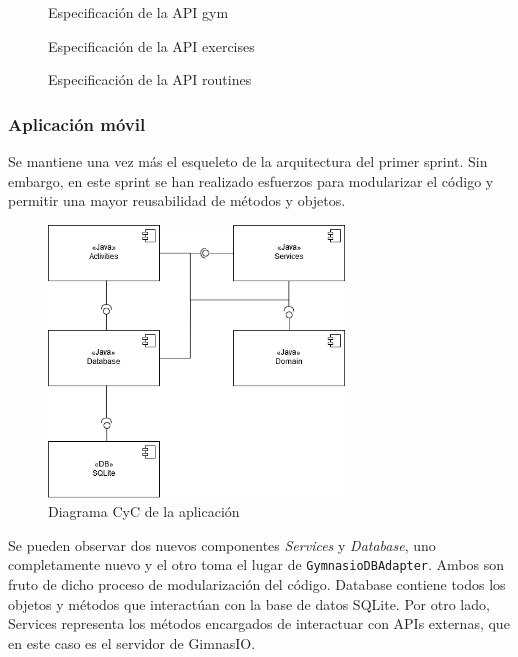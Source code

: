 \documentclass[11pt,a4paper]{report}
\begin{document}
\begin{figure}[H]
	\centering
	
	\caption{Especificación de la API gym}
	\label{cod:apiEx}
\end{figure}
\begin{figure}[H]
	\centering
	
	\caption{Especificación de la API exercises}
	\label{cod:apiRou}
\end{figure}
\newpage
\begin{figure}[H]
	\centering
	
	\label{cod:apiGym}
\end{figure}
\begin{figure}[H]
	\centering
	
	\caption{Especificación de la API routines}
	\label{cod:apiGym}
\end{figure}
\subsubsection{Aplicación móvil}
Se mantiene una vez más el esqueleto de la arquitectura del primer sprint. Sin embargo, en este sprint se han realizado esfuerzos para modularizar el código y permitir una mayor reusabilidad de métodos y objetos. 

\begin{figure}[H]
	\centering
	\includegraphics[width=0.7\textwidth]{graficos/CyCApp.png}
	\caption{Diagrama CyC de la aplicación }
	\label{fig: CyCApp2}
\end{figure}
Se pueden observar dos nuevos componentes \textit{Services} y \textit{Database}, uno completamente nuevo y el otro toma el lugar de \verb|GymnasioDBAdapter|. Ambos son fruto de dicho proceso de modularización del código. Database contiene todos los objetos y métodos que interactúan con la base de datos SQLite. Por otro lado, Services representa los métodos encargados de interactuar con APIs externas, que en este caso es el servidor de GimnasIO.
\end{document}
